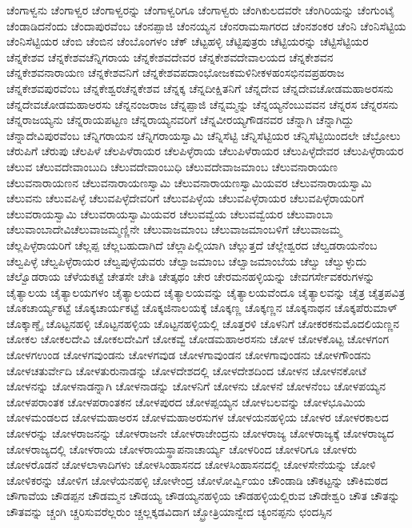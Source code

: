 {ಚೆಂಗಾಳ್ವನು
ಚೆಂಗಾಳ್ವರ
ಚೆಂಗಾಳ್ವರನ್ನು
ಚೆಂಗಾಳ್ವರಿಗೂ
ಚೆಂಗಾಳ್ವರು
ಚೆಂಗಿಕುಲದವರೇ
ಚೆಂಗಿರಿಯನ್ನು
ಚೆಂಗುಂಟೈ
ಚೆಂಡಾಡಿದನೆಂದು
ಚೆಂದಾಪುರವೆಂಬ
ಚೆಂನಪ್ಪಾಜಿ
ಚೆಂನಯ್ಯನ
ಚೆಂನರಾಮಸಾಗರದ
ಚೆಂನಶಂಕರ
ಚೆಂನಿ
ಚೆಂನಿಸೆಟ್ಟಿಯ
ಚೆಂನಿಸೆಟ್ಟಿಯರ
ಚೆಂಬಿ
ಚೆಂಬಿನ
ಚೆಂಬೊಂಗಳಂ
ಚೆಕ್
ಚೆಟ್ಟಹಳ್ಳಿ
ಚೆಟ್ಟಿಪುತ್ರರು
ಚೆಟ್ಟಿಯರನ್ನು
ಚೆಟ್ಟಿಸೆಟ್ಟಿಯರ
ಚೆನ್ನಕೇಶವ
ಚೆನ್ನಕೇಶವಚೆನ್ನಿಗರಾಯ
ಚೆನ್ನಕೇಶವದೇವರ
ಚೆನ್ನಕೇಶವದೇವಾಲಯದ
ಚೆನ್ನಕೇಶವನ
ಚೆನ್ನಕೇಶವನಾರಾಯಣ
ಚೆನ್ನಕೇಶವನಿಗೆ
ಚೆನ್ನಕೇಶವಪದಾಂಭೋಜಕಮಳಿನೀಕಳಹಂಸಭಿನವಪ್ರಹರಾಜ
ಚೆನ್ನಕೇಶವಪುರವೆಂಬ
ಚೆನ್ನಕೇಶ್ವರಚೆನ್ನಕೇಶವ
ಚೆನ್ನಕ್ಕ
ಚೆನ್ನದೀಕ್ಷಿತನಿಗೆ
ಚೆನ್ನದೇವ
ಚೆನ್ನದೇವಚೋಡಮಹಾಅರಸನು
ಚೆನ್ನದೇವಚೋಡಮಹಾಅರಸು
ಚೆನ್ನನಂಜರಾಜ
ಚೆನ್ನಪ್ಪಾಜಿ
ಚೆನ್ನಮ್ಮನ್ನು
ಚೆನ್ನಯ್ಯನೆಂಬುವವನ
ಚೆನ್ನರಸ
ಚೆನ್ನರಸನು
ಚೆನ್ನರಾಜಯ್ಯನು
ಚೆನ್ನರಾಯಪಟ್ಟಣ
ಚೆನ್ನರಾಯ್ಯನವರಿಗೆ
ಚೆನ್ನವೀರಯ್ಯಗೌಡನವರ
ಚೆನ್ನಾಗಿ
ಚೆನ್ನಾಗಿದ್ದು
ಚೆನ್ನಾದೇವಿಪುರವೆಂಬ
ಚೆನ್ನಿಗರಾಯನ
ಚೆನ್ನಿಗರಾಯಸ್ವಾಮಿ
ಚೆನ್ನಿಸೆಟ್ಟಿ
ಚೆನ್ನಿಸೆಟ್ಟಿಯರ
ಚೆನ್ನಿಸೆಟ್ಟಿಯಿಂದಲೇ
ಚೆಬ್ರೋಲು
ಚೆರುಪಿಗೆ
ಚೆರುಪು
ಚೆಲಪಿಳೆ
ಚೆಲಪಿಳೆರಾಯರ
ಚೆಲಪಿಳ್ಳೆರಾಯ
ಚೆಲುಪಿಳೆರಾಯರ
ಚೆಲುಪಿಳ್ಳೆದೇವರ
ಚೆಲುಪಿಳ್ಳೆರಾಯರ
ಚೆಲುವ
ಚೆಲುವದೇವಾಂಬುದಿ
ಚೆಲುವದೇವಾಂಬುಧಿ
ಚೆಲುವದೇವಾಜಮಾಂಬ
ಚೆಲುವನಾರಾಯಣ
ಚೆಲುವನಾರಾಯಣನ
ಚೆಲುವನಾರಾಯಣಸ್ವಾಮಿ
ಚೆಲುವನಾರಾಯಣಸ್ವಾಮಿಯವರ
ಚೆಲುವನಾರಾಯಸ್ವಾಮಿ
ಚೆಲುವನು
ಚೆಲುವಪಿಳ್ಳೆ
ಚೆಲುವಪಿಳ್ಳೆದೇವರಿಗೆ
ಚೆಲುವಪಿಳ್ಳೆಯ
ಚೆಲುವಪಿಳ್ಳೆರಾಯರ
ಚೆಲುವಪಿಳ್ಳೆರಾಯರಿಗೆ
ಚೆಲುವರಾಯಸ್ವಾಮಿ
ಚೆಲುವರಾಯಸ್ವಾಮಿಯವರ
ಚೆಲುವವ್ವೆಯ
ಚೆಲುವವ್ವೆಯರ
ಚೆಲುವಾಂಬಾ
ಚೆಲುವಾಂಬಾದೇವಿಚೆಲುವಾಜಮ್ಮಣ್ಣಿನೇ
ಚೆಲುವಾಜಮಾಂಬ
ಚೆಲುವಾಜಮಾಂಬಳಿಗೆ
ಚೆಲುವಾಜಮ್ಮ
ಚೆಲ್ಲಪಿಳ್ಳೆರಾಯರಿಗೆ
ಚೆಲ್ಲಪ್ಪ
ಚೆಲ್ಲಬಹುದಾಗಿದೆ
ಚೆಲ್ಲಾಪಿಲ್ಲಿಯಾಗಿ
ಚೆಲ್ಲುತ್ತದೆ
ಚೆಲ್ಲೇಶ್ವರದ
ಚೆಲ್ವಡರಾಯನೆಂಬ
ಚೆಲ್ವಪಿಳ್ಳೆ
ಚೆಲ್ವಪಿಳ್ಳೆರಾಯರ
ಚೆಲ್ವಪುಳ್ಳೆಯವರು
ಚೆಲ್ವಾಜಮಾಂಬ
ಚೆಲ್ವಾಜಮಾಂಬೆಯ
ಚೆಲ್ವು
ಚೆಲ್ವುಳ್ಳುದು
ಚೆಲ್ವೊಡರಾಯ
ಚೆಳೆಯಕಟ್ಟೆ
ಚೇತಸೇ
ಚೇತಿ
ಚೇತ್ಕಥಂ
ಚೇರ
ಚೇರಮನಹಳ್ಳಿಯನ್ನು
ಚೇವಗರ್ಸೇವಕರುಗಳನ್ನು
ಚೈತ್ಯಾಲಯ
ಚೈತ್ಯಾಲಯಗಳಂ
ಚೈತ್ಯಾಲಯದ
ಚೈತ್ಯಾಲಯವನ್ನು
ಚೈತ್ಯಾಲಯವೆಂದೂ
ಚೈತ್ಯಾಲವನ್ನು
ಚೈತ್ರ
ಚೈತ್ರಪವಿತ್ರ
ಚೊಕಚಾರ್ಯ್ಯಕಟ್ಟೆ
ಚೊಕ್ಕಚಾರ್ಯಕಟ್ಟೆ
ಚೊಕ್ಕಜಿನಾಲಯಕ್ಕೆ
ಚೊಕ್ಕಣ್ಣ
ಚೊಕ್ಕಣ್ಣನ
ಚೊಕ್ಕನಾಥನ
ಚೊಕ್ಕಪೆರುಮಾಳ್
ಚೊಕ್ಕಾಣ್ಡೈ
ಚೊಟ್ಟನಹಳ್ಳಿ
ಚೊಟ್ಟನಹಳ್ಳಿಯ
ಚೊಟ್ಟನಹಳ್ಳಿಯಲ್ಲಿ
ಚೊತ್ತರಳಿ
ಚೊಳನಿಗೆ
ಚೋಕರಕನುಮೊದಲಿಯಣ್ಣನ
ಚೋಕಲ
ಚೋಕಲದೇವಿ
ಚೋಕಲದೇವಿಗೆ
ಚೋಕವ್ವೆ
ಚೋಡಮಹಾಅರಸನು
ಚೋಳ
ಚೋಳಕೊಟ್ಟ
ಚೋಳಗಂಗ
ಚೋಳಗಉಂಡ
ಚೋಳಗವುಂಡನು
ಚೋಳಗವುಡ
ಚೋಳಗಾವುಂಡನ
ಚೋಳಗಾವುಂಡನು
ಚೋಳಗೌಂಡನು
ಚೋಳಚತುರ್ವೇದಿ
ಚೋಳತುರುನಾಡನ್ನು
ಚೋಳದೇಶದಲ್ಲಿ
ಚೋಳದೇಶದಿಂದ
ಚೋಳನ
ಚೋಳನಕೋಟೆ
ಚೋಳನನ್ನು
ಚೋಳನಾಡನ್ನಾಗಿ
ಚೋಳನಾಡನ್ನು
ಚೋಳನಿಗೆ
ಚೋಳನು
ಚೋಳನೆ
ಚೋಳನೆಂಬ
ಚೋಳಪಯ್ಯನ
ಚೋಳಪರಾಂತಕ
ಚೋಳಪರಾಂತಕನ
ಚೋಳಪುರದ
ಚೋಳಪ್ಪಯ್ಯನ
ಚೋಳಬಲವನ್ನು
ಚೋಳಭೂಮಿಯ
ಚೋಳಮಂಡಲದ
ಚೋಳಮಹಾಅರಸ
ಚೋಳಮಹಾಅರಸುಗಳ
ಚೋಳಯನಹಳ್ಳಿಯ
ಚೋಳರ
ಚೋಳರಕಾಲದ
ಚೋಳರನ್ನು
ಚೋಳರಾಜನನ್ನು
ಚೋಳರಾಜನೇ
ಚೋಳರಾಜೇಂದ್ರನು
ಚೋಳರಾಜ್ಯ
ಚೋಳರಾಜ್ಯಕ್ಕೆ
ಚೋಳರಾಜ್ಯದ
ಚೋಳರಾಜ್ಯದಲ್ಲಿ
ಚೋಳರಾಯ
ಚೋಳರಾಯಸ್ಥಾಪನಾಚಾರ್ಯ್ಯ
ಚೋಳರಿಂದ
ಚೋಳರಿಗೂ
ಚೋಳರು
ಚೋಳರೊಡನೆ
ಚೋಳಲಾಳಾದಿಗಳು
ಚೋಳಸಿಂಹಾಸನದ
ಚೋಳಸಿಂಹಾಸನದಲ್ಲಿ
ಚೋಳಸೇನೆಯನ್ನು
ಚೋಳಿ
ಚೋಳಿಕರನ್ನು
ಚೋಳಿಗ
ಚೋಳೆಯನಹಳ್ಳಿ
ಚೋಳೇಂದ್ರ
ಚೋಳೋರ್ವ್ವಿಯಂ
ಚೌಂಡಾಡಿ
ಚೌಕಟ್ಟನ್ನು
ಚೌಕಿಮಠದ
ಚೌಗಾವೆಯ
ಚೌಡಪ್ಪನ
ಚೌಡಮ್ಮನ
ಚೌಡಯ್ಯ
ಚೌಡಯ್ಯನಹಳ್ಳಿಯ
ಚೌಡಹಳ್ಳಿಯಲ್ಲಿರುವ
ಚೌಡೇಶ್ವರಿ
ಚೌತ
ಚೌತನ್ನು
ಚೌತವನ್ನು
ಚ್ಚಂಗಿ
ಚ್ಚರಿಸುವರೆಲ್ಲರುಂ
ಚ್ಚಲ್ಲಕ್ಕಡವಿದಾಗ
ಚ್ಛ್ರೋತ್ರಿಯಾನ್ವೇದ
ಚ್ಯಂನಪ್ಪನು
ಛಂದಸ್ಸಿನ
}
